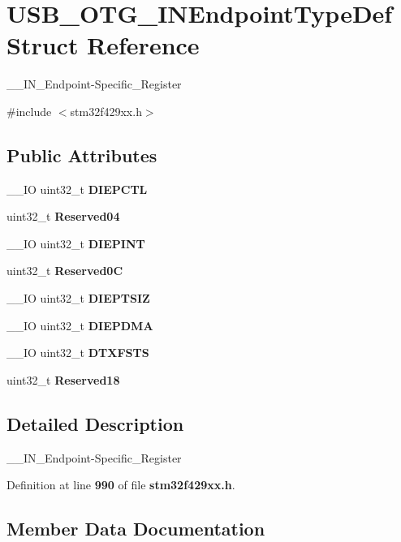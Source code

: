 \section{U\+S\+B\+\_\+\+O\+T\+G\+\_\+\+I\+N\+Endpoint\+Type\+Def Struct Reference}
\label{structUSB__OTG__INEndpointTypeDef}


\+\_\+\+\_\+\+I\+N\+\_\+\+Endpoint-\/\+Specific\+\_\+\+Register  




{\ttfamily \#include $<$stm32f429xx.\+h$>$}

\subsection*{Public Attributes}
\begin{DoxyCompactItemize}
\item 
\+\_\+\+\_\+\+IO uint32\+\_\+t \textbf{ D\+I\+E\+P\+C\+TL}
\item 
uint32\+\_\+t \textbf{ Reserved04}
\item 
\+\_\+\+\_\+\+IO uint32\+\_\+t \textbf{ D\+I\+E\+P\+I\+NT}
\item 
uint32\+\_\+t \textbf{ Reserved0C}
\item 
\+\_\+\+\_\+\+IO uint32\+\_\+t \textbf{ D\+I\+E\+P\+T\+S\+IZ}
\item 
\+\_\+\+\_\+\+IO uint32\+\_\+t \textbf{ D\+I\+E\+P\+D\+MA}
\item 
\+\_\+\+\_\+\+IO uint32\+\_\+t \textbf{ D\+T\+X\+F\+S\+TS}
\item 
uint32\+\_\+t \textbf{ Reserved18}
\end{DoxyCompactItemize}


\subsection{Detailed Description}
\+\_\+\+\_\+\+I\+N\+\_\+\+Endpoint-\/\+Specific\+\_\+\+Register 

Definition at line \textbf{ 990} of file \textbf{ stm32f429xx.\+h}.



\subsection{Member Data Documentation}
\mbox{\label{structUSB__OTG__INEndpointTypeDef_a840b32fa57faa544c3000ae1d08564c7}} 
